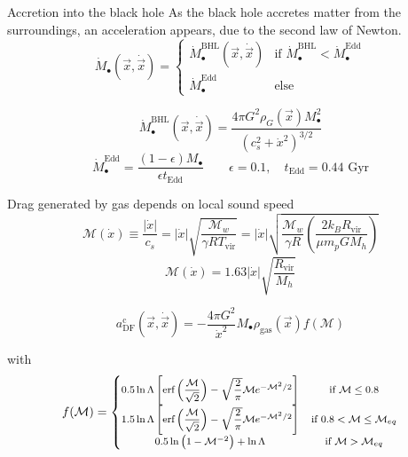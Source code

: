 \documentclass{beamer}
\newcommand{\erf}[1]{\text{erf}\left(#1\right)}
\begin{document}
\begin{frame}{Accretion into the black hole}
	As the black hole accretes matter from the surroundings, an acceleration appears, due to the second law of Newton.
	\begin{equation}
	\dot{M}_\bullet(\vec{x}, \dot{\vec{x}}) = \left\{
	\begin{array}{lc}
	\dot{M}_\bullet^\text{BHL}(\vec{x}, \dot{\vec{x}}) & \text{if $\dot{M}_\bullet^\text{BHL} < \dot{M}_\bullet^\text{Edd}$} \\
	\dot{M}_\bullet^\text{Edd} & \text{else}
	\end{array}
	\right.
	\end{equation}
	
	\begin{equation}
	\dot{M}_\bullet^\text{BHL}(\vec{x}, \dot{\vec{x}}) = \dfrac{4\pi G^2 \rho_G(\vec{x})M^2_\bullet}{\left(c_s^2 + \dot{x}^2\right)^{3/2}} %
	\end{equation}
	\begin{equation}
	\dot{M}_\bullet^\text{Edd} = \dfrac{(1 - \epsilon)M_\bullet}{\epsilon t_\text{Edd}} \qquad \epsilon = 0.1, \quad t_\text{Edd} = 0.44 \text{ Gyr}
	\end{equation}
\end{frame}

\begin{frame}
	Drag generated by gas depends on local sound speed
	\begin{equation}
		\mathcal{M}(\dot{x}) \equiv \dfrac{|\dot{x}|}{c_s} = |\dot{x}|\sqrt{\dfrac{\mathcal{M}_w}{\gamma RT_\text{vir}}} = |\dot{x}|\sqrt{\dfrac{\mathcal{M}_w}{\gamma R}\left(\dfrac{2k_BR_\text{vir}}{\mu m_p G M_h}\right)}
	\end{equation}
	\begin{equation*}
		\mathcal{M}(\dot{x}) = 1.63|\dot{x}|\sqrt{\dfrac{R_\text{vir}}{M_h}}
	\end{equation*}
	
	\begin{equation}\label{eq: df_c}
	a^\text{c}_\text{DF}(\vec{x}, \dot{\vec{x}}) = -\dfrac{4\pi G^2}{\dot{x}^2}M_\bullet\rho_\text{gas}(\vec{x})f(\mathcal{M})
	\end{equation}
	
	with
	\begin{equation}\footnotesize
	f(\mathcal{M}) = \left\{
	\begin{matrix}
	0.5\ln\Lambda \left[\erf{\dfrac{\mathcal{M}}{\sqrt{2}}} - \sqrt{\dfrac{2}{\pi}}\mathcal{M}e^{-\mathcal{M}^2/2}\right]& \text{if $\mathcal{M} \leq 0.8$}\\
	1.5\ln\Lambda \left[\erf{\dfrac{\mathcal{M}}{\sqrt{2}}} - \sqrt{\dfrac{2}{\pi}}\mathcal{M}e^{-\mathcal{M}^2/2}\right] & \text{if $0.8 < \mathcal{M} \leq \mathcal{M}_{eq}$}\\
	0.5\ln\left(1 - \mathcal{M}^{-2}\right) + \ln\Lambda & \text{if $\mathcal{M} > \mathcal{M}_{eq}$}
	\end{matrix}
	\right.
	\end{equation}
\end{frame}
\end{document}
